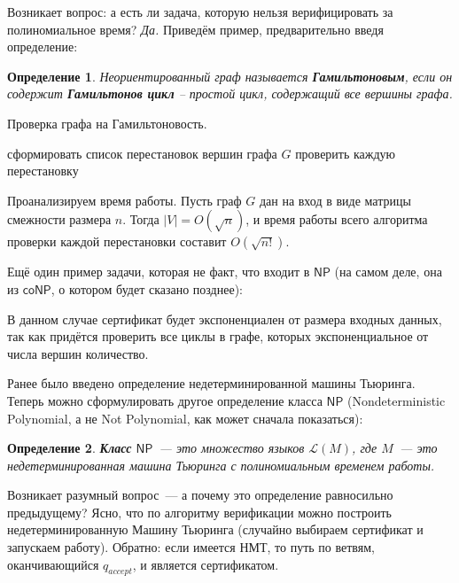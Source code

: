 \documentclass[a4paper,12pt]{article}
\newtheorem{definition}{Определение}
\newcommand{\NPclass}{\mathsf{NP}}
\newcommand{\coNPclass}{\mathsf{coNP}}
\begin{document}
    Возникает вопрос: а есть ли задача, которую нельзя верифицировать за полиномиальное время? \emph{Да.} Приведём пример, предварительно введя определение:
     \begin{definition}
        Неориентированный граф называется \textbf{Гамильтоновым}, если он содержит \textbf{Гамильтонов цикл} -- простой цикл, содержащий все вершины графа.
    \end{definition}
    \begin{algorithm}[H]
        \caption{Проверка графа на Гамильтоновость.}
        \begin{algorithmic}[3]
            \State сформировать список перестановок вершин графа \(G\)
            \State проверить каждую перестановку
        \end{algorithmic}
    \end{algorithm}
    Проанализируем время работы. Пусть граф $G$ дан на вход в виде матрицы смежности размера $n$. Тогда $|V| = O(\sqrt{n})$, и время работы всего алгоритма проверки каждой перестановки составит $O(\sqrt{n!})$.
    
    Ещё один пример задачи, которая не факт, что входит в $\NPclass$ (на самом деле, она из $\coNPclass$, о котором будет сказано позднее):
    \begin{algorithmic}
    \end{algorithmic}
    В данном случае сертификат будет экспоненциален от размера входных данных, так как придётся проверить все циклы в графе, которых экспоненциальное от числа вершин количество.
    
    Ранее было введено определение недетерминированной машины Тьюринга. Теперь можно сформулировать другое определение класса \(\NPclass\) (Nondetermi\-nistic Polynomial, а не Not Polynomial, как может сначала показаться):
    \begin{definition}
        \textbf{Класс} \(\NPclass\)~--- это множество языков \(\mathscr{L}(M)\), где \(M\)~--- это недетерминированная машина Тьюринга с полиномиальным временем работы.
    \end{definition}
    Возникает разумный вопрос~--- а почему это определение равносильно предыдущему? Ясно, что по алгоритму верификации можно построить недетерминированную Машину Тьюринга (случайно выбираем сертификат и запускаем работу). Обратно: если имеется НМТ, то путь по ветвям, оканчивающийся $q_{accept}$, и является сертификатом.
    
\end{document}

